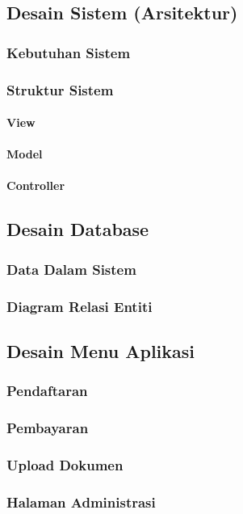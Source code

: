 \subsection{Desain Sistem (Arsitektur)}
\subsubsection{Kebutuhan Sistem}
\subsubsection{Struktur Sistem}
\paragraph{View}
\paragraph{Model}
\paragraph{Controller}

\subsection{Desain Database}
\subsubsection{Data Dalam Sistem}
\subsubsection{Diagram Relasi Entiti}

\subsection{Desain Menu Aplikasi}
\subsubsection{Pendaftaran}
\subsubsection{Pembayaran}
\subsubsection{Upload Dokumen}
\subsubsection{Halaman Administrasi}


